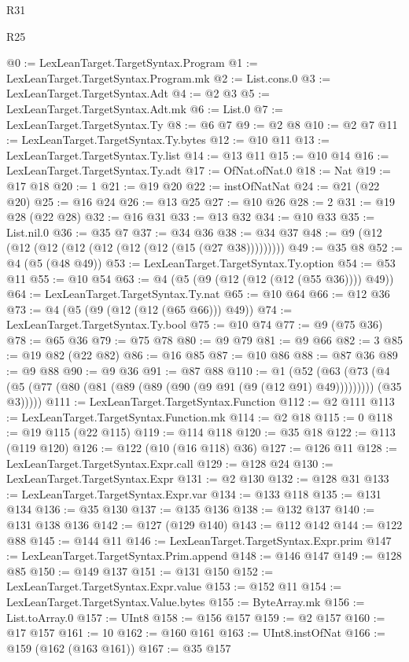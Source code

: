 \begin{lexlean}{R31}
\begin{lexlean}{R25}
\begin{coremodule}
{{{{{{{{{{{{{{{{{{{{{{{{{{{{{{{{{{{{{{{{{{{{{{{{{{{{{{{{{{{{{{{{{{{{{{{{{{{{{{{{{{{{{{{{{{{{{{{{{{{{{{{{{{{{{{{{{{{{{{{{{{{{{{{{{{{{{{{{{{{{{{{{{{{{{{{{{{{{{{{{{{{{{{{{{{{{{{{{{{{{{{{{{{{{{{{{{{{{{{{@0 := LexLeanTarget.TargetSyntax.Program
@1 := LexLeanTarget.TargetSyntax.Program.mk
@2 := List.cons.{0}
@3 := LexLeanTarget.TargetSyntax.Adt
@4 := @2 @3
@5 := LexLeanTarget.TargetSyntax.Adt.mk
@6 := List.{0}
@7 := LexLeanTarget.TargetSyntax.Ty
@8 := @6 @7
@9 := @2 @8
@10 := @2 @7
@11 := LexLeanTarget.TargetSyntax.Ty.bytes
@12 := @10 @11
@13 := LexLeanTarget.TargetSyntax.Ty.list
@14 := @13 @11
@15 := @10 @14
@16 := LexLeanTarget.TargetSyntax.Ty.adt
@17 := OfNat.ofNat.{0}
@18 := Nat
@19 := @17 @18
@20 := 1
@21 := @19 @20
@22 := instOfNatNat
@24 := @21 (@22 @20)
@25 := @16 @24
@26 := @13 @25
@27 := @10 @26
@28 := 2
@31 := @19 @28 (@22 @28)
@32 := @16 @31
@33 := @13 @32
@34 := @10 @33
@35 := List.nil.{0}
@36 := @35 @7
@37 := @34 @36
@38 := @34 @37
@48 := @9 (@12 (@12 (@12 (@12 (@12 (@12 (@12 (@15 (@27 @38)))))))))
@49 := @35 @8
@52 := @4 (@5 (@48 @49))
@53 := LexLeanTarget.TargetSyntax.Ty.option
@54 := @53 @11
@55 := @10 @54
@63 := @4 (@5 (@9 (@12 (@12 (@12 (@55 @36)))) @49))
@64 := LexLeanTarget.TargetSyntax.Ty.nat
@65 := @10 @64
@66 := @12 @36
@73 := @4 (@5 (@9 (@12 (@12 (@65 @66))) @49))
@74 := LexLeanTarget.TargetSyntax.Ty.bool
@75 := @10 @74
@77 := @9 (@75 @36)
@78 := @65 @36
@79 := @75 @78
@80 := @9 @79
@81 := @9 @66
@82 := 3
@85 := @19 @82 (@22 @82)
@86 := @16 @85
@87 := @10 @86
@88 := @87 @36
@89 := @9 @88
@90 := @9 @36
@91 := @87 @88
@110 := @1
    (@52
      (@63
        (@73 (@4 (@5 (@77 (@80 (@81 (@89 (@89 (@90 (@9 @91 (@9 (@12 @91) @49))))))))) (@35 @3)))))
@111 := LexLeanTarget.TargetSyntax.Function
@112 := @2 @111
@113 := LexLeanTarget.TargetSyntax.Function.mk
@114 := @2 @18
@115 := 0
@118 := @19 @115 (@22 @115)
@119 := @114 @118
@120 := @35 @18
@122 := @113 (@119 @120)
@126 := @122 (@10 (@16 @118) @36)
@127 := @126 @11
@128 := LexLeanTarget.TargetSyntax.Expr.call
@129 := @128 @24
@130 := LexLeanTarget.TargetSyntax.Expr
@131 := @2 @130
@132 := @128 @31
@133 := LexLeanTarget.TargetSyntax.Expr.var
@134 := @133 @118
@135 := @131 @134
@136 := @35 @130
@137 := @135 @136
@138 := @132 @137
@140 := @131 @138 @136
@142 := @127 (@129 @140)
@143 := @112 @142
@144 := @122 @88
@145 := @144 @11
@146 := LexLeanTarget.TargetSyntax.Expr.prim
@147 := LexLeanTarget.TargetSyntax.Prim.append
@148 := @146 @147
@149 := @128 @85
@150 := @149 @137
@151 := @131 @150
@152 := LexLeanTarget.TargetSyntax.Expr.value
@153 := @152 @11
@154 := LexLeanTarget.TargetSyntax.Value.bytes
@155 := ByteArray.mk
@156 := List.toArray.{0}
@157 := UInt8
@158 := @156 @157
@159 := @2 @157
@160 := @17 @157
@161 := 10
@162 := @160 @161
@163 := UInt8.instOfNat
@166 := @159 (@162 (@163 @161))
@167 := @35 @157
}}}}}}}}}}}}}}}}}}}}}}}}}}}}}}}}}}}}}}}}}}}}}}}}}}}}}}}}}}}}}}}}}}}}}}}}}}}}}}}}}}}}}}}}}}}}}}}}}}}}}}}}}}}}}}}}}}}}}}}}}}}}}}}}}}}}}}}}}}}}}}}}}}}}}}}}}}}}}}}}}}}}}}}}}}}}}}}}}}}}}}}}}}}}}}}}}}}}}}}
\end{coremodule}
\end{lexlean}
\end{lexlean}
